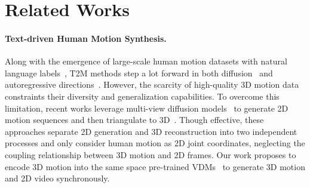 \section{Related Works}
\label{sec:rw}

\paragraph{\bf Text-driven Human Motion Synthesis.} Along with the emergence of large-scale human motion datasets with natural language labels~\cite{plappert2016kit,mahmood2019amass,punnakkal2021babel,guo2022ml3d,black2023bedlam,lin2023motionx,wang2024quo,lu2025scamo,fan2025gotozero,ren2025motionpro,wu2025finemotion,wang2024beingbyondm0,cao2025beingbeyondm05,tesch2025bedlam2,mclean2025embody,cao2025reconstructing,dou2023tore,wu2024dice,cui2025user}, T2M methods step a lot forward in both diffusion~\cite{tevet2022mdm,zhang2023remodiffuse,chen2023mld,dai2024motionlcm,zhou2024emdm,meng2025mardm} and autoregressive  directions~\cite{ahn2018text2action,zhang2023t2mgpt,jiang2023motiongpt,guo2024momask,wu2024motion,xiao2025motionstreamer}. However, the scarcity of high-quality 3D motion data constraints their diversity and generalization capabilities. To overcome this limitation, recent works leverage multi-view diffusion models~\cite{liu2023syncdreamer,huang2025mvadapter,cai2025up2you,chen2025synchuman} to generate 2D motion sequences and then triangulate to 3D~\cite{pi2024motion2to3,huang2025animax}. Though effective, these approaches separate 2D generation and 3D reconstruction into two independent processes and only consider human motion as 2D joint coordinates, neglecting the coupling relationship between 3D motion and 2D frames. Our work proposes to encode 3D motion into the same space pre-trained VDMs~\cite{hong2022cogvideo,blattmann2023svd,yang2024cogvideox,kong2024hunyuanvideo,wan2025wan,agarwal2025cosmos} to generate 3D motion and 2D video synchronously.

\vspace{-2mm}
